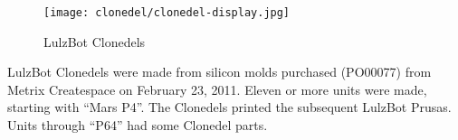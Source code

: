 %
%
%
%
%

\begin{figure}[h!]
\texttt{[image: clonedel/clonedel-display.jpg]}
 \caption{LulzBot Clonedels}
 \label{fig:clonedel-clonedel-display}
\end{figure}

LulzBot Clonedels were made from silicon molds purchased (PO00077)
from Metrix Createspace on February 23, 2011. Eleven or more units were made,
starting with ``Mars P4''. The Clonedels printed the subsequent LulzBot Prusas.
Units through ``P64'' had some Clonedel parts.















